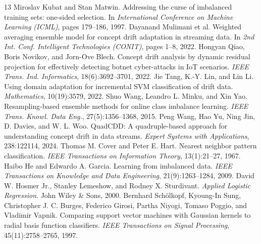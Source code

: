 \documentclass[preprint,10pt]{elsarticle}
\begin{document}
\begin{thebibliography}{13}
 Miroslav Kubat and Stan Matwin. Addressing the curse of imbalanced training sets: one-sided selection. In \emph{International Conference on Machine Learning (ICML)}, pages 179--186, 1997.
 Dayanand Mulimani et al. Weighted averaging ensemble model for concept drift adaptation in streaming data. In \emph{2nd Int. Conf. Intelligent Technologies (CONIT)}, pages 1--8, 2022.
 Hongyan Qiao, Boris Novikov, and Jorn-Ove Blech. Concept drift analysis by dynamic residual projection for effectively detecting botnet cyber-attacks in IoT scenarios. \emph{IEEE Trans. Ind. Informatics}, 18(6):3692--3701, 2022.
 Jie Tang, K.-Y. Lin, and Lin Li. Using domain adaptation for incremental SVM classification of drift data. \emph{Mathematics}, 10(19):3579, 2022.
 Shuo Wang, Leandro L. Minku, and Xin Yao. Resampling-based ensemble methods for online class imbalance learning. \emph{IEEE Trans. Knowl. Data Eng.}, 27(5):1356--1368, 2015.
 Peng Wang, Hao Yu, Ning Jin, D. Davies, and W. L. Woo. QuadCDD: A quadruple-based approach for understanding concept drift in data streams. \emph{Expert Systems with Applications}, 238:122114, 2024.
 Thomas M. Cover and Peter E. Hart. Nearest neighbor pattern classification. \emph{IEEE Transactions on Information Theory}, 13(1):21--27, 1967.
 Haibo He and Edwardo A. Garcia. Learning from imbalanced data. \emph{IEEE Transactions on Knowledge and Data Engineering}, 21(9):1263--1284, 2009.
 David W. Hosmer Jr., Stanley Lemeshow, and Rodney X. Sturdivant. \emph{Applied Logistic Regression}. John Wiley \& Sons, 2000.
 Bernhard Sch\"olkopf, Kyoung-In Sung, Christopher J. C. Burges, Federico Girosi, Partha Niyogi, Tomaso Poggio, and Vladimir Vapnik. Comparing support vector machines with Gaussian kernels to radial basis function classifiers. \emph{IEEE Transactions on Signal Processing}, 45(11):2758--2765, 1997.
\end{thebibliography}
\end{document}
